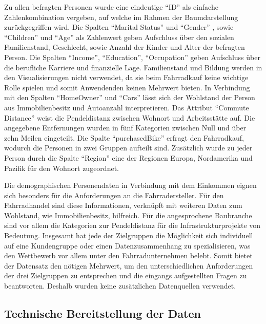 \documentclass[usegeometry=true]{scrartcl}
\begin{document}
Zu allen befragten Personen wurde eine eindeutige "`ID"' als einfache Zahlenkombination vergeben, auf welche im Rahmen der Baumdarstellung zurückgegriffen wird. 
 Die Spalten "`Marital Status"' und "`Gender"' , sowie  "`Children"' und "`Age"' als Zahlenwert geben Aufschluss über den sozialen  Familienstand, Geschlecht, sowie Anzahl der Kinder und Alter der befragten Person. Die Spalten "`Income"', "`Education"', "`Occupation"' geben Aufschluss über die berufliche Karriere und finanzielle Lage. Familienstand und Bildung werden in den Visualisierungen nicht verwendet, da sie beim Fahrradkauf keine wichtige Rolle spielen und somit Anwendenden keinen Mehrwert bieten. In Verbindung mit den Spalten "`HomeOwner"' und "`Cars"' lässt sich der Wohlstand der Person aus Immobilienbesitz und Autoanzahl interpretieren. Das Attribut "`Commute Distance"' weist die Pendeldistanz zwischen Wohnort und Arbeitsstätte auf. Die angegebene Entfernungen wurden in fünf Kategorien zwischen Null und über zehn Meilen eingeteilt. Die Spalte "`purchasedBike"' erfragt den Fahrradkauf, wodurch die Personen in zwei Gruppen aufteilt sind. Zusätzlich wurde zu jeder Person durch die Spalte "`Region"' eine der Regionen Europa, Nordamerika und Pazifik für den Wohnort zugeordnet.

Die demographischen Personendaten in Verbindung mit dem Einkommen eignen sich besonders für die Anforderungen an die Fahrradersteller. Für den Fahrradhandel sind diese Informationen, verknüpft mit weiteren Daten zum Wohlstand, wie Immobilienbesitz, hilfreich. Für die angesprochene Baubranche sind vor allem die Kategorien zur Pendeldistanz für die Infrastrukturprojekte von Bedeutung. 
Insgesamt hat jede der Zielgruppen die Möglichkeit sich individuell auf eine Kundengruppe oder einen Datenzusammenhang zu spezialisieren, was den Wettbewerb vor allem unter den Fahrradunternehmen belebt. Somit bietet der Datensatz den nötigen Mehrwert, um den unterschiedlichen Anforderungen der drei Zielgruppen zu entsprechen und die eingangs aufgestellten Fragen zu beantworten. Deshalb wurden keine zusätzlichen Datenquellen verwendet. 

\subsection{Technische Bereitstellung der Daten}
\end{document}
